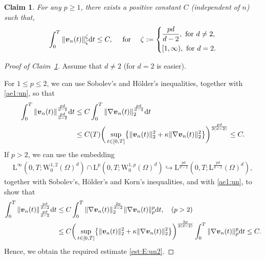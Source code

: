 \documentclass[12pt,reqno]{amsart}
\numberwithin{equation}{section}
\newtheorem{claim}{Claim}
\let\originalleft\left
\let\originalright\right
\renewcommand{\left}{\mathopen{}\mathclose\bgroup\originalleft}
\renewcommand{\right}{\aftergroup\egroup\originalright}
\theoremstyle{definition}
\def\1{\Omega}
\def\d{\mathrm{d}}
\def\W{\mathrm{W}}
\def\L{\mathrm{L}}
\def\vv{\boldsymbol{v}}
\begin{document}
\begin{claim}\label{claim:3}
For any $p\geq1$, there exists a positive constant $C$ (independent of $n$) such that,
\begin{equation}\label{est:E:un2}
	  \int_{0}^{T}\|\vv_n(t)\|^{\zeta}_{\zeta}\d t\leq C, \quad \text{ for }\quad  \zeta :=\left\{
	  \begin{aligned}
	  	& \frac{pd}{d-2}, \text{ for } d\neq  2,\\
	  	&[1,\infty), \text{ for } d=2.
	  \end{aligned}
	  \right.
\end{equation}
\end{claim}
\begin{proof}[Proof of Claim~\ref{claim:3}]
Assume that $d\not=2$ (for $d=2$ is easier).

For $1\leq p\leq 2$, we can use Sobolev's and H\"older's inequalities, together with \eqref{ae1:un}, so that
\begin{equation*}
\begin{split}
\int_{0}^{T}\|\vv_n(t)\|^{\frac{pd}{d-2}}_{\frac{pd}{d-2}}\d t & \leq
C\int_{0}^{T}\|\nabla\vv_n(t)\|_2^{\frac{pd}{d-2}}\d t \\
&
\leq C(T)\bigg(\sup_{t\in[0,T]}\left\{\|\vv_n(t)\|^{2}_2+\kappa\|\nabla\vv_n(t)\|^{2}_2\right\}\bigg)^{\frac{pd}{2(d-2)}}\leq C.
\end{split}
\end{equation*}
If $p>2$, we can use the embedding \begin{align*}
	\L^\infty(0,T;\W_0^{1,2}(\1)^d)\cap\L^p(0,T;\W_0^{1,p}(\1)^d)\hookrightarrow \L^{\frac{pd}{d-2}}(0,T;\L^{\frac{pd}{d-2}}(\1)^d),
\end{align*}
together with Sobolev's, H\"older's and Korn's inequalities,  and with \eqref{ae1:un}, to show that
\begin{equation*}
\begin{split}
\int_{0}^{T}\|\vv_n(t)\|^{\frac{pd}{d-2}}_{\frac{pd}{d-2}}\d t & \leq C\int_{0}^{T}\|\nabla\vv_n(t)\|_2^{\frac{2p}{d-2}}\|\nabla\vv_n(t)\|_p^{p}\d t,\quad (p>2)  \\
& \leq C\bigg(\sup_{t\in[0,T]}\left\{\|\vv_n(t)\|^{2}_2+\kappa\|\nabla\vv_n(t)\|^{2}_2\right\}\bigg)^{\frac{2p}{2(d-2)}} \int_{0}^{T}\|\nabla\vv_n(t)\|_p^{p}\d t\leq C.
\end{split}
\end{equation*}
Hence, we obtain the required estimate \eqref{est:E:un2}.
\end{proof}
\end{document}
